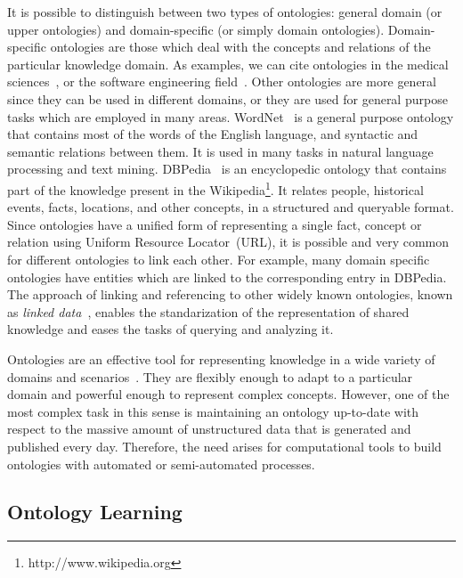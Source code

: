     It is possible to distinguish between two types of ontologies: general domain (or upper ontologies) and domain-specific (or simply domain ontologies).
    Domain-specific ontologies are those which deal with the concepts and relations of the particular knowledge domain.
    As examples, we can cite ontologies in the medical sciences~\cite{rector2003opengalen,gene2004gene},
    or the software engineering field~\cite{4641930}.
    Other ontologies are more general since they can be used in different domains, or they are used for general
    purpose tasks which are employed in many areas.
    WordNet~\cite{miller1995wordnet} is a general purpose ontology that contains most of the words of the English language,
    and syntactic and semantic relations between them.
    It is used in many tasks in natural language processing and text mining.
    DBPedia~\cite{mendes2012dbpedia} is an encyclopedic ontology that contains part of the knowledge present in the
    Wikipedia\footnote{http://www.wikipedia.org}.
    It relates people, historical events, facts, locations, and other concepts, in a structured and queryable format.
    Since ontologies have a unified form of representing a single fact, concept or relation using Uniform Resource Locator~(URL), it is
    possible and very common for different ontologies to link each other. For example, many domain specific ontologies
    have entities which are linked to the corresponding entry in DBPedia. The approach of linking and referencing to other
  	widely known ontologies, known as \textit{linked data}~\cite{bizer2009linked},
    enables the standarization of the representation of shared knowledge and eases the tasks of querying and analyzing it.

    Ontologies are an effective tool for representing knowledge in a wide
    variety of domains and scenarios~\cite{staab2010handbook}.
    They are flexibly enough to adapt to a particular domain and powerful enough to represent complex concepts.
    However, one of the most complex task in this sense is maintaining
    an ontology up-to-date with respect to the massive amount of unstructured data that is generated and published every day.
	Therefore, the need arises for computational tools to build ontologies with automated or semi-automated processes.

    \subsection{Ontology Learning}

